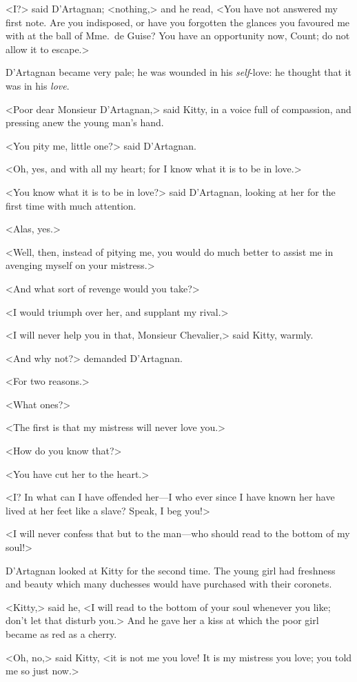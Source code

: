 <I?> said D'Artagnan; <nothing,> and he read, <You have not answered my first note. Are you indisposed, or have you forgotten the glances you favoured me with at the ball of Mme.~de Guise? You have an opportunity now, Count; do not allow it to escape.> 

D'Artagnan became very pale; he was wounded in his \emph{self}-love: he thought that it was in his \emph{love}. 

<Poor dear Monsieur D'Artagnan,> said Kitty, in a voice full of compassion, and pressing anew the young man's hand. 

<You pity me, little one?> said D'Artagnan. 

<Oh, yes, and with all my heart; for I know what it is to be in love.> 

<You know what it is to be in love?> said D'Artagnan, looking at her for the first time with much attention. 

<Alas, yes.> 

<Well, then, instead of pitying me, you would do much better to assist me in avenging myself on your mistress.> 

<And what sort of revenge would you take?> 

<I would triumph over her, and supplant my rival.> 

<I will never help you in that, Monsieur Chevalier,> said Kitty, warmly. 

<And why not?> demanded D'Artagnan. 

<For two reasons.> 

<What ones?> 

<The first is that my mistress will never love you.> 

<How do you know that?> 

<You have cut her to the heart.> 

<I? In what can I have offended her—I who ever since I have known her have lived at her feet like a slave? Speak, I beg you!> 

<I will never confess that but to the man—who should read to the bottom of my soul!> 

D'Artagnan looked at Kitty for the second time. The young girl had freshness and beauty which many duchesses would have purchased with their coronets. 

<Kitty,> said he, <I will read to the bottom of your soul whenever you like; don't let that disturb you.> And he gave her a kiss at which the poor girl became as red as a cherry. 

<Oh, no,> said Kitty, <it is not me you love! It is my mistress you love; you told me so just now.> 


